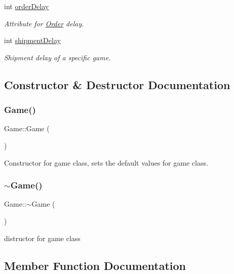 \begin{DoxyCompactItemize}
int \hyperlink{class_game_afc75f56db8dd8f3ffe78d670eeea536d}{order\+Delay}
\begin{DoxyCompactList}\small\item\em Attribute for \hyperlink{class_order}{Order} delay. \end{DoxyCompactList}\item 
int \hyperlink{class_game_ae7c8b91149db62d25ea552d71b053bde}{shipment\+Delay}
\begin{DoxyCompactList}\small\item\em Shipment delay of a specific game. \end{DoxyCompactList}\end{DoxyCompactItemize}


\subsection{Constructor \& Destructor Documentation}
\mbox{\label{class_game_ad59df6562a58a614fda24622d3715b65}} 
\subsubsection{\texorpdfstring{Game()}{Game()}}
{\footnotesize\ttfamily Game\+::\+Game (\begin{DoxyParamCaption}{ }\end{DoxyParamCaption})}



Constructor for game class, sets the default values for game class. 

\mbox{\label{class_game_ae3d112ca6e0e55150d2fdbc704474530}} 
\subsubsection{\texorpdfstring{$\sim$\+Game()}{~Game()}}
{\footnotesize\ttfamily Game\+::$\sim$\+Game (\begin{DoxyParamCaption}{ }\end{DoxyParamCaption})}



distructor for game class 



\subsection{Member Function Documentation}
\mbox{\label{class_game_a0e6b1f8c9d598c7eb860d04c218fa546}} 
